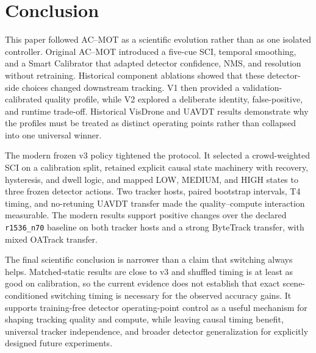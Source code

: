 \section{Conclusion}
This paper followed AC--MOT as a scientific evolution rather than as one isolated controller. Original AC--MOT introduced a five-cue SCI, temporal smoothing, and a Smart Calibrator that adapted detector confidence, NMS, and resolution without retraining. Historical component ablations showed that these detector-side choices changed downstream tracking. V1 then provided a validation-calibrated quality profile, while V2 explored a deliberate identity, false-positive, and runtime trade-off. Historical VisDrone and UAVDT results demonstrate why the profiles must be treated as distinct operating points rather than collapsed into one universal winner.

The modern frozen v3 policy tightened the protocol. It selected a crowd-weighted SCI on a calibration split, retained explicit causal state machinery with recovery, hysteresis, and dwell logic, and mapped LOW, MEDIUM, and HIGH states to three frozen detector actions. Two tracker hosts, paired bootstrap intervals, T4 timing, and no-retuning UAVDT transfer made the quality--compute interaction measurable. The modern results support positive changes over the declared \texttt{r1536\_n70} baseline on both tracker hosts and a strong ByteTrack transfer, with mixed OATrack transfer.

The final scientific conclusion is narrower than a claim that switching always helps. Matched-static results are close to v3 and shuffled timing is at least as good on calibration, so the current evidence does not establish that exact scene-conditioned switching timing is necessary for the observed accuracy gains. It supports training-free detector operating-point control as a useful mechanism for shaping tracking quality and compute, while leaving causal timing benefit, universal tracker independence, and broader detector generalization for explicitly designed future experiments.

